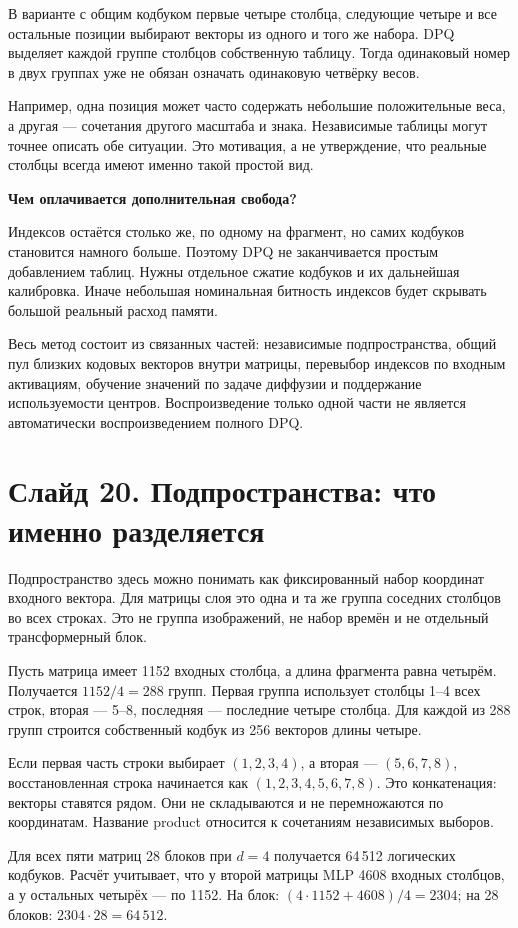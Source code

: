 \documentclass[a4paper,11pt]{article}
\newcommand{\slide}[2]{\clearpage\section*{Слайд #1. #2}}
\newcommand{\question}[1]{\par\textbf{#1}\par}
\begin{document}
В варианте с общим кодбуком первые четыре столбца,
следующие четыре и все остальные позиции выбирают
векторы из одного и того же набора. DPQ выделяет каждой
группе столбцов собственную таблицу. Тогда одинаковый номер
в двух группах уже не обязан означать одинаковую четвёрку весов.

Например, одна позиция может часто содержать небольшие
положительные веса, а другая --- сочетания другого масштаба
и знака. Независимые таблицы могут точнее описать
обе ситуации. Это мотивация, а не утверждение,
что реальные столбцы всегда имеют именно такой простой вид.

\question{Чем оплачивается дополнительная свобода?}
Индексов остаётся столько же, по одному на фрагмент,
но самих кодбуков становится намного больше.
Поэтому DPQ не заканчивается простым добавлением таблиц.
Нужны отдельное сжатие кодбуков и их дальнейшая калибровка.
Иначе небольшая номинальная битность индексов
будет скрывать большой реальный расход памяти.

Весь метод состоит из связанных частей: независимые
подпространства, общий пул близких кодовых векторов
внутри матрицы, перевыбор индексов по входным активациям,
обучение значений по задаче диффузии и поддержание
используемости центров. Воспроизведение только одной части
не является автоматически воспроизведением полного DPQ.

\slide{20}{Подпространства: что именно разделяется}
Подпространство здесь можно понимать как фиксированный
набор координат входного вектора. Для матрицы слоя
это одна и та же группа соседних столбцов во всех строках.
Это не группа изображений, не набор времён
и не отдельный трансформерный блок.

Пусть матрица имеет 1152 входных столбца, а длина фрагмента
равна четырём. Получается $1152/4=288$ групп.
Первая группа использует столбцы 1--4 всех строк,
вторая --- 5--8, последняя --- последние четыре столбца.
Для каждой из 288 групп строится собственный кодбук
из 256 векторов длины четыре.

Если первая часть строки выбирает $(1,2,3,4)$,
а вторая --- $(5,6,7,8)$, восстановленная строка
начинается как $(1,2,3,4,5,6,7,8)$.
Это конкатенация: векторы ставятся рядом.
Они не складываются и не перемножаются по координатам.
Название product относится к сочетаниям независимых выборов.

Для всех пяти матриц 28 блоков при $d=4$ получается
64\,512 логических кодбуков. Расчёт учитывает, что
у второй матрицы MLP 4608 входных столбцов,
а у остальных четырёх --- по 1152.
На блок: $(4\cdot1152+4608)/4=2304$;
на 28 блоков: $2304\cdot28=64\,512$.
\end{document}
